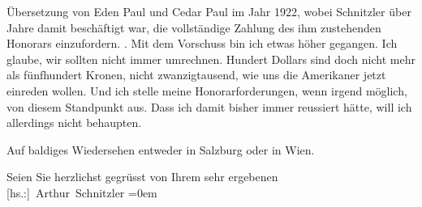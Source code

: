 {{{                     Übersetzung von Eden Paul und Cedar Paul 
                  im Jahr 1922, wobei Schnitzler über Jahre damit
                     beschäftigt war, die vollständige Zahlung des ihm zustehenden Honorars einzufordern.
                  }}}\label{K_L03763-3}. Mit dem Vorschuss bin ich etwas höher gegangen. Ich glaube, wir
               sollten nicht immer umrechnen. Hundert Dollars sind doch nicht mehr als fünfhundert
               Kronen, nicht zwanzigtausend, wie uns die Amerikaner jetzt einreden wollen. Und ich stelle meine Honorarforderungen,
               wenn irgend möglich, von diesem Standpunkt aus. Dass ich damit bisher immer reussiert
               hätte, will ich allerdings nicht behaupten.\pend
           
\pstart
           Auf baldiges Wiedersehen entweder in Salzburg oder
               in Wien.\pend
           
\pstart
           Seien Sie herzlichst gegrüsst von Ihrem sehr ergebenen{\\[\baselineskip]}\spacefill\mbox{{[}hs.:{]} Arthur Schnitzler}\pend
           \leftskip=0em{}\endnumbering{}  \newcommand{\dateiname}{L03763}\newcommand{\titel}{Arthur Schnitzler an Stefan Zweig, 20. 8. 1920}\newcommand{\editorInnen}{Selma Jahnke und Martin Anton Müller}
